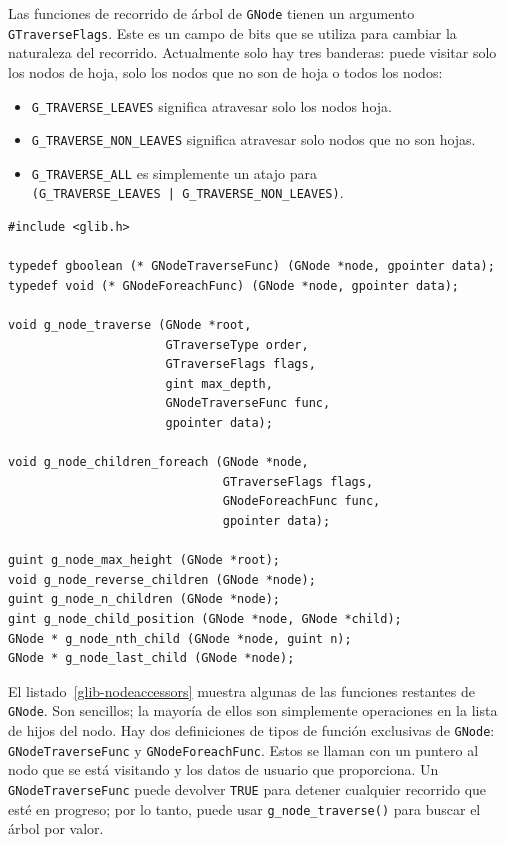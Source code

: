 Las funciones de recorrido de árbol de \lstinline{GNode} tienen un argumento \lstinline{GTraverseFlags}. Este es un campo de bits que se utiliza para cambiar la naturaleza del recorrido. Actualmente solo hay tres banderas: puede visitar solo los nodos de hoja, solo los nodos que no son de hoja o todos los nodos:
\begin{itemize}
    \item \lstinline{G_TRAVERSE_LEAVES} significa atravesar solo los nodos hoja.
    \item \lstinline{G_TRAVERSE_NON_LEAVES} significa atravesar solo nodos que no son hojas.
    \item \lstinline{G_TRAVERSE_ALL} es simplemente un atajo para \\
    \lstinline{(G_TRAVERSE_LEAVES | G_TRAVERSE_NON_LEAVES)}.
\end{itemize}

\begin{lstlisting}[style=GLib/GTK, caption={Accediendo a un \lstinline{GNode}}, label=glib-nodeaccessors]
#include <glib.h>

typedef gboolean (* GNodeTraverseFunc) (GNode *node, gpointer data);
typedef void (* GNodeForeachFunc) (GNode *node, gpointer data);

void g_node_traverse (GNode *root,
                      GTraverseType order,
                      GTraverseFlags flags,
                      gint max_depth,
                      GNodeTraverseFunc func,
                      gpointer data);

void g_node_children_foreach (GNode *node,
                              GTraverseFlags flags,
                              GNodeForeachFunc func,
                              gpointer data);

guint g_node_max_height (GNode *root);
void g_node_reverse_children (GNode *node);
guint g_node_n_children (GNode *node);
gint g_node_child_position (GNode *node, GNode *child);
GNode * g_node_nth_child (GNode *node, guint n);
GNode * g_node_last_child (GNode *node);
\end{lstlisting}

El listado~\ref{glib-nodeaccessors} muestra algunas de las funciones restantes de \lstinline{GNode}. Son sencillos; la mayoría de ellos son simplemente operaciones en la lista de hijos del nodo. Hay dos definiciones de tipos de función exclusivas de \lstinline{GNode}: \lstinline{GNodeTraverseFunc} y \lstinline{GNodeForeachFunc}. Estos se llaman con un puntero al nodo que se está visitando y los datos de usuario que proporciona. Un \lstinline{GNodeTraverseFunc} puede devolver \lstinline{TRUE} para detener cualquier recorrido que esté en progreso; por lo tanto, puede usar \lstinline{g_node_traverse()} para buscar el árbol por valor.

